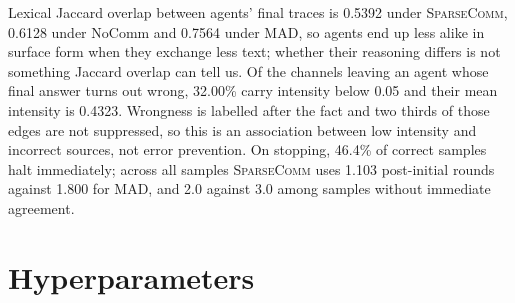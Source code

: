 \documentclass[11pt]{article}
\newcommand{\sys}{\textsc{SparseComm}\xspace}
\begin{document}
Lexical Jaccard overlap between agents' final traces is 0.5392 under \sys,
0.6128 under NoComm and 0.7564 under MAD, so agents end up less alike in surface
form when they exchange less text; whether their reasoning differs is not
something Jaccard overlap can tell us. Of the channels leaving an agent whose
final answer turns out wrong, 32.00\% carry intensity below 0.05 and their mean
intensity is 0.4323. Wrongness is labelled after the fact and two thirds of
those edges are not suppressed, so this is an association between low intensity
and incorrect sources, not error prevention. On stopping, 46.4\% of correct
samples halt immediately; across all samples \sys uses 1.103 post-initial rounds
against 1.800 for MAD, and 2.0 against 3.0 among samples without immediate
agreement.

\section{Hyperparameters}
\label{app:hyperparameters}

\begin{table}[H]
\centering
\small
{}
\caption{Controller, optimization and inference settings.}
\label{tab:hyperparameters}
\end{table}
\end{document}
